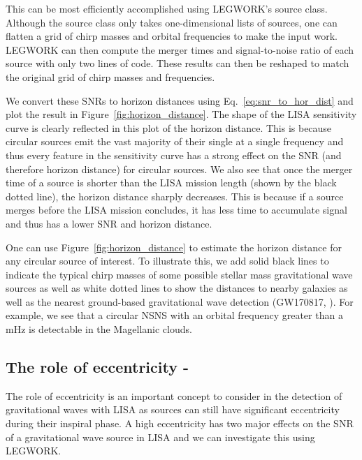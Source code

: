 \documentclass[twocolumn]{aastex63}
\newcommand{\lw}{LEGWORK}
\newcommand{\lwColour}{SeaGreen}
\newcommand{\tutorialIcon}{{\color{\lwColour}{\faLaptopCode}}}
\newcommand{\tutorialLink}[1]{\href{#1}{\tutorialIcon}}
\newcommand{\notebookIcon}{{\color{\lwColour}{\faBook}}}
\newcommand{\notebookLink}[1]{\href{#1}{\notebookIcon}}
\begin{document}
This can be most efficiently accomplished using \lw{}'s source class. Although the source class only takes one-dimensional lists of sources, one can flatten a grid of chirp masses and orbital frequencies to make the input work. \lw{} can then compute the merger times and signal-to-noise ratio of each source with only two lines of code. These results can then be reshaped to match the original grid of chirp masses and frequencies.

We convert these SNRs to horizon distances using Eq.~\ref{eq:snr_to_hor_dist} and plot the result in Figure~\ref{fig:horizon_distance}. The shape of the LISA sensitivity curve is clearly reflected in this plot of the horizon distance. This is because circular sources emit the vast majority of their single at a single frequency and thus every feature in the sensitivity curve has a strong effect on the SNR (and therefore horizon distance) for circular sources. We also see that once the merger time of a source is shorter than the LISA mission length (shown by the black dotted line), the horizon distance sharply decreases. This is because if a source merges before the LISA mission concludes, it has less time to accumulate signal and thus has a lower SNR and horizon distance.

One can use Figure~\ref{fig:horizon_distance} to estimate the horizon distance for any circular source of interest. To illustrate this, we add solid black lines to indicate the typical chirp masses of some possible stellar mass gravitational wave sources as well as white dotted lines to show the distances to nearby galaxies as well as the nearest ground-based gravitational wave detection (GW170817, \citealp{Abbott+2017_GW170817}). For example, we see that a circular NSNS with an orbital frequency greater than a mHz is detectable in the Magellanic clouds.

\subsection{The role of eccentricity\texorpdfstring{ - \tutorialLink{https://legwork.readthedocs.io/en/latest/demos/TheRoleofEccentricity.html} \notebookLink{https://github.com/TeamLEGWORK/LEGWORK/blob/main/docs/demos/TheRoleofEccentricity.ipynb}}{}}\label{sec:eccentricity_role}

The role of eccentricity is an important concept to consider in the detection of gravitational waves with LISA as sources can still have significant eccentricity during their inspiral phase. A high eccentricity has two major effects on the SNR of a gravitational wave source in LISA and we can investigate this using \lw{}.
\end{document}
